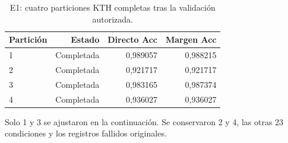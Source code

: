 \begin{table}[!htbp]\centering
\fontsize{8}{10}\selectfont\setlength{\tabcolsep}{4pt}
\caption{E1: cuatro particiones KTH completas tras la validación autorizada.}\label{tab:e1-kth-state}
\begin{tabular}{@{}lrrr@{}}\toprule
Partición & Estado & Directo Acc & Margen Acc\\\midrule
1 & Completada & 0,989057 & 0,988215\\
2 & Completada & 0,921717 & 0,921717\\
3 & Completada & 0,983165 & 0,987374\\
4 & Completada & 0,936027 & 0,936027\\
\bottomrule\end{tabular}
\par\smallskip\begin{minipage}{0.98\textwidth}\footnotesize Solo 1 y 3 se ajustaron en la continuación. Se conservaron 2 y 4, las otras 23 condiciones y los registros fallidos originales.\end{minipage}
\end{table}
